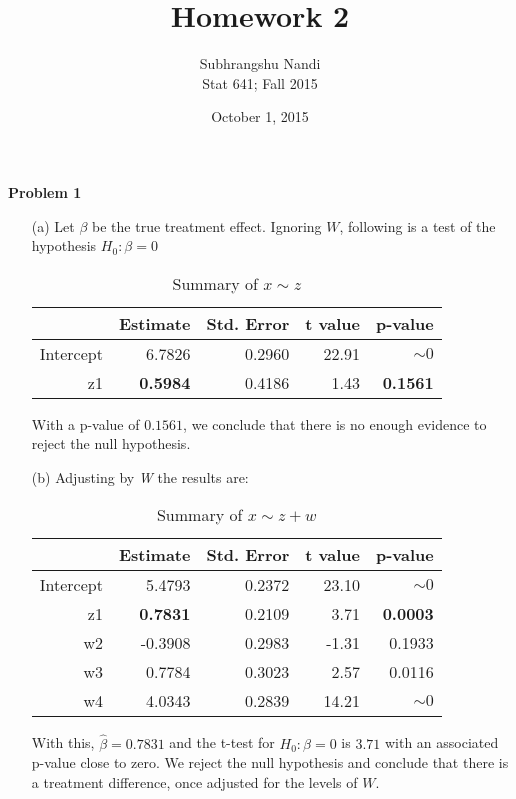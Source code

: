 \documentclass[11pt,a4paper]{article}
\begin{document}
\title{Homework 2}
\author{Subhrangshu Nandi\\
  Stat 641; Fall 2015}
\date{October 1, 2015}

\maketitle

\noindent
\textbf{Problem 1} 
\begin{itemize}
\item[(a)] Let $\beta$ be the true treatment effect. Ignoring $W$, following is a test of the hypothesis $H_0: \beta = 0$
\begin{table}[H]
\centering
\begin{tabular}{rrrrr}
  \hline
 & Estimate & Std. Error & t value & p-value \\ 
  \hline
Intercept & 6.7826 & 0.2960 & 22.91 & $\sim 0$ \\ 
z1 & \textbf{0.5984} & 0.4186 & 1.43 & \textbf{0.1561} \\ 
   \hline
\end{tabular}
\caption{Summary of \texttt{$x \sim z$}}
\end{table}
With a p-value of $0.1561$, we conclude that there is no enough evidence to reject the null hypothesis.

\item[(b)]
Adjusting by \emph{W} the results are:
\begin{table}[H]
\centering
\begin{tabular}{rrrrr}
  \hline
 & Estimate & Std. Error & t value & p-value \\ 
  \hline
Intercept & 5.4793 & 0.2372 & 23.10 & $\sim 0$ \\ 
  z1 & \textbf{0.7831} & 0.2109 & 3.71 & \textbf{0.0003} \\ 
  w2 & -0.3908 & 0.2983 & -1.31 & 0.1933 \\ 
  w3 & 0.7784 & 0.3023 & 2.57 & 0.0116 \\ 
  w4 & 4.0343 & 0.2839 & 14.21 & $\sim 0$ \\ 
   \hline
\end{tabular}
\caption{Summary of \texttt{$x \sim z + w$}}
\end{table}

With this, $\hat{\beta}=0.7831$ and the t-test for $H_0:\beta=0$ is $3.71$ with an associated p-value close
to zero. We reject the null hypothesis and conclude that there is a treatment difference, once adjusted for the levels of $W$.


\end{itemize}
\end{document}
